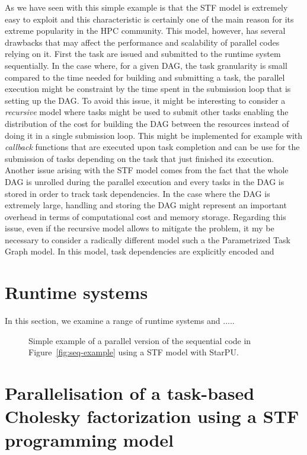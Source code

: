 \documentclass{article}
\newcommand{\starpu}{{StarPU}\xspace}
\begin{document}
As we have seen with this simple example is that the STF model is
extremely easy to exploit and this characteristic is certainly one of
the main reason for its extreme popularity in the HPC community. This
model, however, has several drawbacks that may affect the performance
and scalability of parallel codes relying on it. First the task are
issued and submitted to the runtime system sequentially. In the case
where, for a given DAG, the task granularity is small compared to the
time needed for building and submitting a task, the parallel execution
might be constraint by the time spent in the submission loop that is
setting up the DAG. To avoid this issue, it might be interesting to
consider a \textit{recursive} model where tasks might be used to
submit other tasks enabling the distribution of the cost for building
the DAG between the resources instead of doing it in a single
submission loop. This might be implemented for example with
\textit{callback} functions that are executed upon task completion and
can be use for the submission of tasks depending on the task that just
finished its execution. Another issue arising with the STF model comes
from the fact that the whole DAG is unrolled during the parallel
execution and every tasks in the DAG is stored in order to track task
dependencies. In the case where the DAG is extremely large, handling
and storing the DAG might represent an important overhead in terms of
computational cost and memory storage. Regarding this issue, even if
the recursive model allows to mitigate the problem, it my be necessary
to consider a radically different model such a the Parametrized Task
Graph model. In this model, task dependencies are explicitly encoded
and

\section{Runtime systems}\label{sec:runtime}
\setcounter{equation}{0}
\setcounter{table}{0}
\setcounter{figure}{0}
In this section, we examine a range of runtime systems and .....

\begin{figure}[!h]
  \centering 
  \caption{\label{fig:stf-starpu-example}Simple example of a parallel version
    of the sequential code in Figure~\ref{fig:seq-example} using a STF
    model with \starpu.}
\end{figure}

\section{Parallelisation of a task-based Cholesky factorization using a STF programming model}
\label{sec:experiments}
\end{document}
